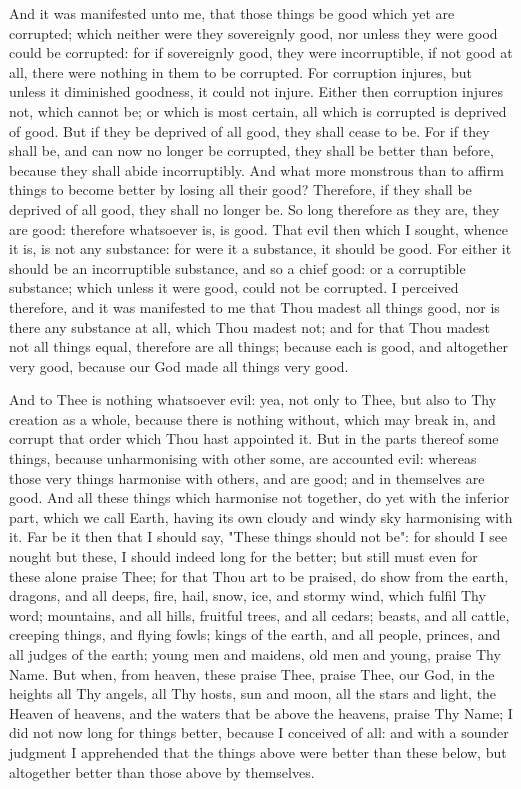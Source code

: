 \documentclass[b5paper,openright,12pt,twoside]{book}
\begin{document}
And it was manifested unto me, that those things be good which yet are
corrupted; which neither were they sovereignly good, nor unless they
were good could be corrupted: for if sovereignly good, they were
incorruptible, if not good at all, there were nothing in them to be
corrupted. For corruption injures, but unless it diminished goodness, it
could not injure. Either then corruption injures not, which cannot be;
or which is most certain, all which is corrupted is deprived of good.
But if they be deprived of all good, they shall cease to be. For if they
shall be, and can now no longer be corrupted, they shall be better than
before, because they shall abide incorruptibly. And what more monstrous
than to affirm things to become better by losing all their good?
Therefore, if they shall be deprived of all good, they shall no longer
be. So long therefore as they are, they are good: therefore whatsoever
is, is good. That evil then which I sought, whence it is, is not any
substance: for were it a substance, it should be good. For either
it should be an incorruptible substance, and so a chief good: or
a corruptible substance; which unless it were good, could not be
corrupted. I perceived therefore, and it was manifested to me that Thou
madest all things good, nor is there any substance at all, which Thou
madest not; and for that Thou madest not all things equal, therefore are
all things; because each is good, and altogether very good, because our
God made all things very good.

And to Thee is nothing whatsoever evil: yea, not only to Thee, but also
to Thy creation as a whole, because there is nothing without, which may
break in, and corrupt that order which Thou hast appointed it. But in
the parts thereof some things, because unharmonising with other some,
are accounted evil: whereas those very things harmonise with others,
and are good; and in themselves are good. And all these things which
harmonise not together, do yet with the inferior part, which we call
Earth, having its own cloudy and windy sky harmonising with it. Far be
it then that I should say, "These things should not be": for should I
see nought but these, I should indeed long for the better; but still
must even for these alone praise Thee; for that Thou art to be praised,
do show from the earth, dragons, and all deeps, fire, hail, snow,
ice, and stormy wind, which fulfil Thy word; mountains, and all hills,
fruitful trees, and all cedars; beasts, and all cattle, creeping things,
and flying fowls; kings of the earth, and all people, princes, and all
judges of the earth; young men and maidens, old men and young, praise
Thy Name. But when, from heaven, these praise Thee, praise Thee, our
God, in the heights all Thy angels, all Thy hosts, sun and moon, all the
stars and light, the Heaven of heavens, and the waters that be above the
heavens, praise Thy Name; I did not now long for things better, because
I conceived of all: and with a sounder judgment I apprehended that the
things above were better than these below, but altogether better than
those above by themselves.
\end{document}

